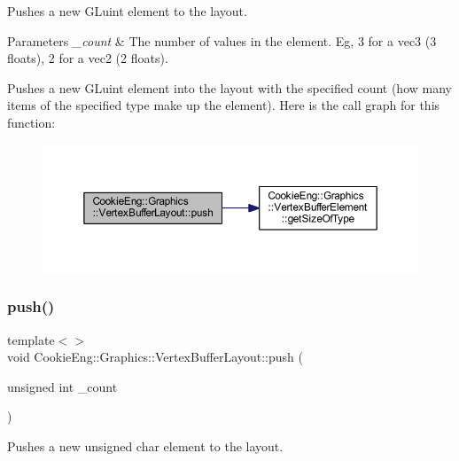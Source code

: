 Pushes a new G\+Luint element to the layout. 


\begin{DoxyParams}{Parameters}
{\em \+\_\+count} & The number of values in the element. Eg, 3 for a vec3 (3 floats), 2 for a vec2 (2 floats).\\
\hline
\end{DoxyParams}
Pushes a new G\+Luint element into the layout with the specified count (how many items of the specified type make up the element). Here is the call graph for this function\+:
\nopagebreak
\begin{figure}[H]
\begin{center}
\leavevmode
\includegraphics[width=350pt]{class_cookie_eng_1_1_graphics_1_1_vertex_buffer_layout_a3f1a639714762ec45edf48a68995d7bd_cgraph}
\end{center}
\end{figure}
\mbox{\label{class_cookie_eng_1_1_graphics_1_1_vertex_buffer_layout_a3f1a639714762ec45edf48a68995d7bd}} 
\subsubsection{push()\hspace{0.1cm}{\footnotesize\ttfamily [4/4]}}
{\footnotesize\ttfamily template$<$$>$ \\
void Cookie\+Eng\+::\+Graphics\+::\+Vertex\+Buffer\+Layout\+::push (\begin{DoxyParamCaption}\item[{unsigned int}]{\+\_\+count }\end{DoxyParamCaption})\hspace{0.3cm}{\ttfamily [inline]}}



Pushes a new unsigned char element to the layout. 


